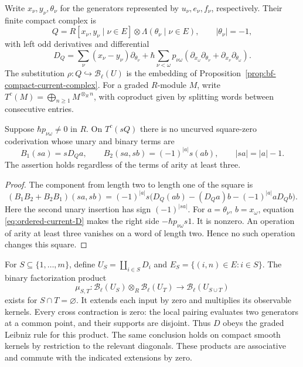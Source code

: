 Write $x_\nu,y_\nu,\theta_\nu$ for the generators represented by
$u_\nu,e_\nu,f_\nu$, respectively.  Their finite compact complex is
\[
 Q=R[x_\nu,y_\nu\mid\nu\in E]\otimes\Lambda(\theta_\nu\mid\nu\in E),
 \qquad |\theta_\nu|=-1,
\]
with left odd derivatives and differential
\begin{equation}
\label{eq:ordered-current-D}
 D_Q=\sum_\nu(x_\nu-y_\nu)\partial_{\theta_\nu}
 +\hbar\sum_{\nu<\omega}p_{\nu\omega}
 (\partial_{x_\omega}\partial_{\theta_\nu}
  +\partial_{x_\nu}\partial_{\theta_\omega}).
\end{equation}
The substitution $\rho:Q\hookrightarrow\mathcal B_\ell(U)$ is the
embedding of Proposition~\ref{prop:bf-compact-current-complex}.
For a graded $R$-module $M$, write
$T^c(M)=\bigoplus_{n\ge1}M^{\otimes_R n}$, with coproduct given
by splitting words between consecutive entries.

\begin{proposition}
\label{prop:ordered-current-overlap-obstruction}
Suppose $\hbar p_{\nu\omega}\ne0$ in $R$.
On $T^c(sQ)$ there is no uncurved square-zero coderivation whose
unary and binary terms are
\[
 B_1(sa)=sD_Qa,\qquad B_2(sa,sb)=(-1)^{|a|}s(ab),
 \qquad |sa|=|a|-1.
\]
The assertion holds regardless of the terms of arity at least three.
\end{proposition}
\begin{proof}
The component from length two to length one of the square is
\[
 (B_1B_2+B_2B_1)(sa,sb)
 =(-1)^{|a|}s\bigl(D_Q(ab)-(D_Qa)b-(-1)^{|a|}aD_Qb\bigr).
\]
Here the second unary insertion has sign $(-1)^{|sa|}$.
For $a=\theta_\nu$, $b=x_\omega$, equation
\eqref{eq:ordered-current-D} makes the right side
$-\hbar p_{\nu\omega}s1$.
It is nonzero.  An operation of arity at least three vanishes
on a word of length two.  Hence no such operation changes this square.
\end{proof}

For $S\subseteq\{1,\ldots,m\}$, define
$U_S=\coprod_{i\in S}D_i$ and $E_S=\{(i,n)\in E:i\in S\}$.
The binary factorization product
\[
 \mu_{S,T}:\mathcal B_\ell(U_S)\otimes_R\mathcal B_\ell(U_T)
       \longrightarrow\mathcal B_\ell(U_{S\cup T})
\]
exists for $S\cap T=\varnothing$.  It extends each input by zero
and multiplies its observable kernels.
Every cross contraction is zero: the local pairing evaluates two
generators at a common point, and their supports are disjoint.
Thus $D$ obeys the graded Leibniz rule for this product.
The same conclusion holds on compact smooth kernels by restriction
to the relevant diagonals.  These products are associative and
commute with the indicated extensions by zero.

